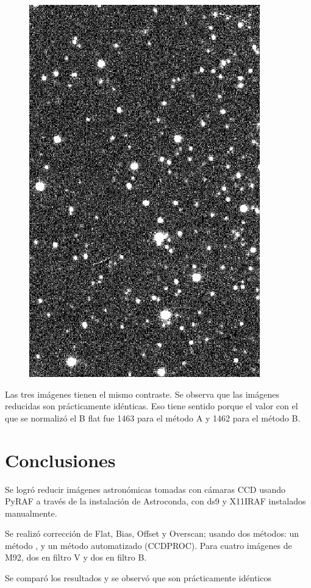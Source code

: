 \documentclass[12pt]{article}
\begin{document}
\begin{figure}[H]
         \includegraphics[scale= 0.35]{redB.png}
  \label{im03}
\end{figure}


Las tres imágenes tienen el mismo contraste. Se observa que las imágenes reducidas son prácticamente idénticas.
Eso tiene sentido porque el valor con el que se normalizó el B flat fue 1463 para el método A y 1462 para el método B.

\section{Conclusiones}

Se logró reducir imágenes astronómicas tomadas con cámaras CCD usando PyRAF a través de la instalación de Astroconda, con ds9 y X11IRAF instalados manualmente.

Se realizó corrección de Flat, Bias, Offset y Overscan; usando dos métodos: un método , y un método automatizado (CCDPROC).
Para cuatro imágenes de M92, dos en filtro V y dos en filtro B.

Se comparó los resultados y se observó que son prácticamente idénticos








{}

\end{document}
